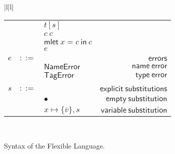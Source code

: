 \documentclass[preprint,authoryear,sort&compress,9pt,nocopyrightspace]{article}
\newcommand{\subx}{x \mapsto \{\overline{v}\},s}
\newcommand{\oletP}[3]{\mathsf{mlet} \ x = #2 \ \mathsf{in}  \ #3}
\newcommand{\nameerror}{\mathsf{NameError}}
\newcommand{\typeerror}{\mathsf{TagError}}
\newcommand{\semanticA}{Flexible Language}
\begin{document}
\begin{figure}[h]
\begin{small}
\begin{center}
\begin{tabular}{|l|l|}
\begin{tabular}{l c l r}
&&$t[s]$&\\
&&$c \ c $&\\
&&$\oletP {T}{c}{c}$&\\
&&$e$&\\
&&&\\
$e$&$::=$&&$\mathsf {errors}$\\
&&$\nameerror$&$\mathsf {name \ error}$\\
&&$\typeerror$&$\mathsf {type \ error}$\\
&&&\\
$s$&$::=$&&$\mathsf {explicit \ substitutions}$\\
&&$ \bullet$&$\mathsf {empty \ substitution}$\\
&&$\subx$&$\mathsf {variable \ substitution}$\\
\end{tabular}\\
\hline
\end{tabular}
\hspace*{-2cm}
\caption{Syntax of the \semanticA.}
\label{figure:sintax1}
\end{center}
\end{small}
\end{figure}
\end{document}
